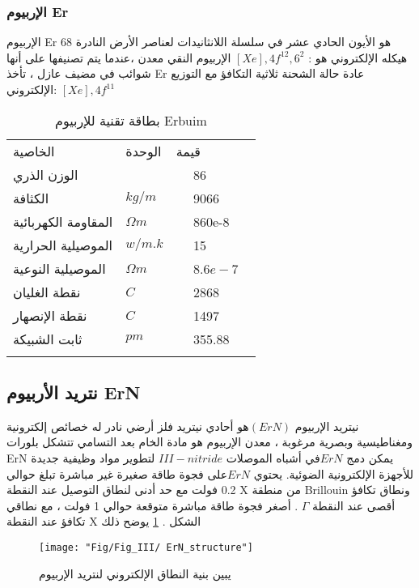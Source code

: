 \subsubsection{ الإربيوم Er}
الإربيوم  Er 68 هو الأيون الحادي عشر في سلسلة اللانثانيدات  لعناصر الأرض النادرة هيكله الإلكتروني هو :       
$ [Xe], 4f^{12},6^{2} $
الإربيوم النقي معدن ،عندما يتم تصنيفها على أنها شوائب في مضيف عازل ، تأخذ Er عادة حالة الشحنة ثلاثية التكافؤ  مع التوزيع الإلكتروني:
$ [Xe], 4f ^{11} $
\begin{table}
	\centering
	\begin{tabular}{lll}
		\hline\noalign{\smallskip}
		الخاصية   & الوحدة  & قيمة \\
		\noalign{\smallskip}\hline\noalign{\smallskip}
		الوزن الذري  &   &   ~~   86 ~  \\
		الكثافة  &   $ kg /m  $    & ~~  9066  \\
		المقاومة الكهربائية &$ \Omega m $ &~~ 860e-8~   \\
		الموصيلية الحرارية  &$ w/m.k $ &~~ 15  ~   \\
		الموصيلية  النوعية& $ \Omega m $ &~~ $  8.6e-7 $  ~   \\
		نقطة الغليان   &$ C $ &~~  2868  ~   \\
		نقطة الإنصهار  & $ C $ &~~   1497   ~   \\
		ثابت الشبيكة  & $ pm $  &~~    355.88   ~   \\
		
		
		\noalign{\smallskip}\hline
	\end{tabular}
	\caption{ بطاقة تقنية للإربيوم Erbuim  }
	\label{tab:1}
\end{table}
\FloatBarrier
\subsection{ نتريد الأربيوم  ErN  }
نيتريد الإربيوم $ (ErN)  $هو أحادي نيتريد فلز أرضي نادر له خصائص إلكترونية ومغناطيسية وبصرية مرغوبة ، معدن الإربيوم هو مادة الخام بعد التسامي  تتشكل بلورات ErN
يمكن دمج $ ErN  $في أشباه الموصلات $ III-nitride $ لتطوير مواد وظيفية جديدة للأجهزة الإلكترونية الضوئية. يحتوي $ ErN  $على فجوة طاقة صغيرة غير مباشرة تبلغ حوالي 0.2 فولت مع حد أدنى لنطاق التوصيل عند النقطة   X  من منطقة Brillouin ونطاق تكافؤ أقصى عند النقطة $\Gamma$ . أصغر فجوة طاقة مباشرة متوقعة حوالي 1 فولت ، مع نطاقي تكافؤ عند النقطة  X  
الشكل . \ref{fig:ern}
يوضح ذلك 
 \begin{figure}[h]
 	\centering
 	\texttt{[image: "Fig/Fig\_III/ ErN\_structure"]}
 	\caption{يبين بنية النطاق الإلكتروني لنتريد الإربيوم}
 	\label{fig:ern}
 \end{figure}
 

